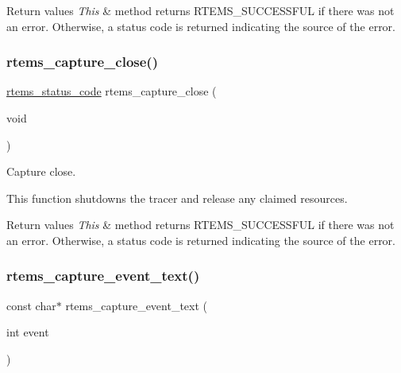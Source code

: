 \begin{DoxyRetVals}{Return values}
{\em This} & method returns R\+T\+E\+M\+S\+\_\+\+S\+U\+C\+C\+E\+S\+S\+F\+UL if there was not an error. Otherwise, a status code is returned indicating the source of the error. \\
\hline
\end{DoxyRetVals}
\mbox{\label{group__libmisc__capture_ga57b44945c2da07711529761d91af585a}} 
\subsubsection{\texorpdfstring{rtems\_capture\_close()}{rtems\_capture\_close()}}
{\footnotesize\ttfamily \mbox{\hyperlink{group__ClassicStatus_ga545d41846817eaba6143d52ee4d9e9fe}{rtems\+\_\+status\+\_\+code}} rtems\+\_\+capture\+\_\+close (\begin{DoxyParamCaption}\item[{void}]{ }\end{DoxyParamCaption})}



Capture close. 

This function shutdowns the tracer and release any claimed resources.


\begin{DoxyRetVals}{Return values}
{\em This} & method returns R\+T\+E\+M\+S\+\_\+\+S\+U\+C\+C\+E\+S\+S\+F\+UL if there was not an error. Otherwise, a status code is returned indicating the source of the error. \\
\hline
\end{DoxyRetVals}
\mbox{\label{group__libmisc__capture_ga3b0d9a7d62de5b9b9e648e47132033cc}} 
\subsubsection{\texorpdfstring{rtems\_capture\_event\_text()}{rtems\_capture\_event\_text()}}
{\footnotesize\ttfamily const char$\ast$ rtems\+\_\+capture\+\_\+event\+\_\+text (\begin{DoxyParamCaption}\item[{int}]{event }\end{DoxyParamCaption})}



